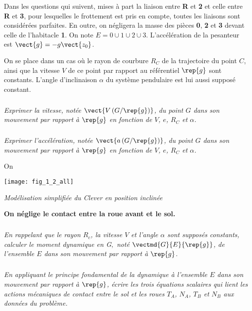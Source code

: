 \begin{multicols}{2}
Dans les questions qui suivent, mises à part la liaison entre \textbf{R} et \textbf{2} et celle entre \textbf{R} et \textbf{3}, pour lesquelles le frottement est pris en compte, toutes les liaisons sont considérées parfaites. En outre, on négligera la masse des pièces \textbf{0}, \textbf{2} et \textbf{3} devant celle de l'habitacle \textbf{1}. On note $E=0\cup 1 \cup 2 \cup 3$. L'accélération de la pesanteur est  $\vect{g}=-g\vect{z_0}$.

On se place dans un cas où le rayon de courbure $R_C$ de la trajectoire du point $C$, ainsi que la vitesse $V$ de ce point par rapport au référentiel $\rep{g}$ sont constants. L'angle d'inclinaison $\alpha$  du système pendulaire est lui aussi supposé constant.



\subparagraph{}\textit{Exprimer la vitesse, notée $\vect{V\left(G/\rep{g}\right)}$, du point $G$ dans son mouvement par rapport à $\rep{g}$ en fonction de $V$, $e$, $R_C$ et $\alpha$.}
\ifprof
\begin{corrige}
\end{corrige}
\else
\fi


\subparagraph{}\textit{Exprimer l'accélération, notée $\vect{a\left(G/\rep{g}\right)}$, du point $G$ dans son mouvement par rapport à $\rep{g}$ en fonction de $V$, $e$, $R_C$ et $\alpha$.}
\ifprof
\begin{corrige}
\end{corrige}
\else
\fi

On 

\begin{center}%
\centering
\texttt{[image: fig\_1\_2\_all]}

\textit{Modélisation simplifiée du Clever en position inclinée}
\label{fig_1_2}
\end{center}
 
 \textbf{On néglige le contact entre la roue avant et le sol.}
 
\subparagraph{}\textit{En rappelant que le rayon $R_c$, la vitesse $V$ et l'angle $\alpha$ sont supposés constants, calculer le moment dynamique en G$,$ noté $\vectmd{G}{E}{\rep{g}}$, de l'ensemble $E$ dans son mouvement par rapport à $\rep{g}$. }
\ifprof
\begin{corrige}
\end{corrige}
\else
\fi

\subparagraph{}\textit{En appliquant le principe fondamental de la dynamique à l'ensemble $E$ dans son mouvement par rapport à $\rep{g}$, écrire les trois équations scalaires qui lient les actions mécaniques de contact entre le sol et les roues $T_A$, $N_A$, $T_B$ et $N_B$ aux données du problème.}
\ifprof
\begin{corrige}
\end{corrige}
\else
\fi


\end{multicols}
